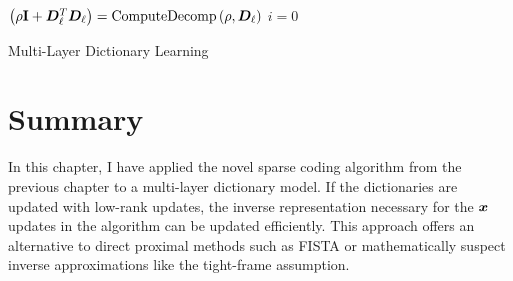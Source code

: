 \begin{algorithm}[h]
\SetAlgoLined
   \Input{Over-relaxation parameter: $\alpha \in (0,2]$, Signal: $\vs$, Unnormalized initial dictionary for each layer: $\mD_{\ell}$, Objective function term coefficients for each layer: $\mu_{\ell}$ and $\lambda_{\ell}$}
   {
      $\left(\rho{\bf I} + \bm{D}_{\ell}^T\bm{D}_{\ell}\right) = \operatorname{ComputeDecomp}\left(\rho,\bm{D}_{\ell} \right)$
   }
   $i = 0$ \\
 \caption{Multi-Layer Dictionary Learning}\label{algorithm:Multi-Layer Dictionary Learning}
\end{algorithm}

\section{Summary}
In this chapter, I have applied the novel sparse coding algorithm from the previous chapter to a multi-layer dictionary model. If the dictionaries are updated with low-rank updates, the inverse representation necessary for the $\bm{x}$ updates in the algorithm can be updated efficiently. This approach offers an alternative to direct proximal methods such as FISTA or mathematically suspect inverse approximations like the tight-frame assumption.
